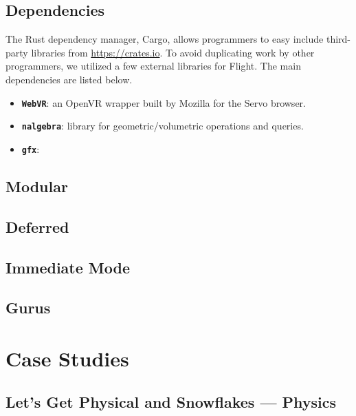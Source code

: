 \documentclass[conference,12pt]{IEEEtran}
\begin{document}
\subsection{Dependencies}
The Rust dependency manager, Cargo, allows programmers to easy include
third-party libraries from \url{https://crates.io}. To avoid duplicating work
by other programmers, we utilized a few external libraries for Flight. The main
dependencies are listed below.
\begin{itemize}
    \item \textbf{\texttt{WebVR}}: an OpenVR wrapper built by Mozilla for the
        Servo browser.
    \item \textbf{\texttt{nalgebra}}: library for geometric/volumetric
        operations and queries.
    \item \textbf{\texttt{gfx}}: %
\end{itemize}

\subsection{Modular}

\subsection{Deferred}

\subsection{Immediate Mode}

\subsection{Gurus} %


\section{Case Studies}\label{sec:case-studies}

\subsection{Let's Get Physical and Snowflakes --- Physics}
\end{document}
